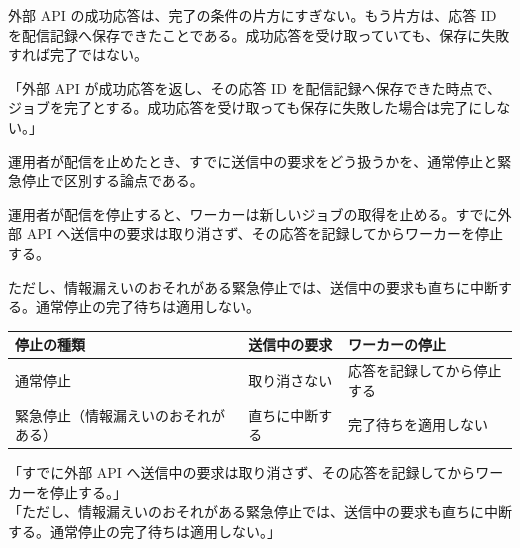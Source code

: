 \documentclass[10pt]{article}
\begin{document}
\begin{mayoi}
外部 API の成功応答は、完了の条件の片方にすぎない。もう片方は、応答 ID を配信記録へ保存できたことである。成功応答を受け取っていても、保存に失敗すれば完了ではない。
\end{mayoi}

\begin{genbun}
「外部 API が成功応答を返し、その応答 ID を配信記録へ保存できた時点で、ジョブを完了とする。成功応答を受け取っても保存に失敗した場合は完了にしない。」
\end{genbun}

運用者が配信を止めたとき、すでに送信中の要求をどう扱うかを、通常停止と緊急停止で区別する論点である。

\begin{youten}
運用者が配信を停止すると、ワーカーは新しいジョブの取得を止める。すでに外部 API へ送信中の要求は取り消さず、その応答を記録してからワーカーを停止する。

ただし、情報漏えいのおそれがある緊急停止では、送信中の要求も直ちに中断する。通常停止の完了待ちは適用しない。
\end{youten}

\begin{tabular}{L{0.34}lL{0.32}}
\toprule
停止の種類 & 送信中の要求 & ワーカーの停止 \\
\midrule
通常停止 & 取り消さない & 応答を記録してから停止する \\
緊急停止（情報漏えいのおそれがある） & 直ちに中断する & 完了待ちを適用しない \\
\bottomrule
\end{tabular}

\begin{genbun}
「すでに外部 API へ送信中の要求は取り消さず、その応答を記録してからワーカーを停止する。」\\
「ただし、情報漏えいのおそれがある緊急停止では、送信中の要求も直ちに中断する。通常停止の完了待ちは適用しない。」
\end{genbun}
\end{document}

